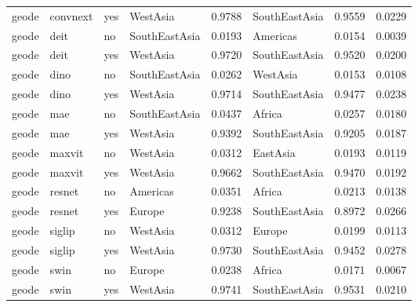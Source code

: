 \begin{table}[ht]
{\begin{tabular}{llllllll}
geode & convnext & yes & WestAsia & 0.9788 & SouthEastAsia & 0.9559 & 0.0229 \\
geode & deit & no & SouthEastAsia & 0.0193 & Americas & 0.0154 & 0.0039 \\
geode & deit & yes & WestAsia & 0.9720 & SouthEastAsia & 0.9520 & 0.0200 \\
geode & dino & no & SouthEastAsia & 0.0262 & WestAsia & 0.0153 & 0.0108 \\
geode & dino & yes & WestAsia & 0.9714 & SouthEastAsia & 0.9477 & 0.0238 \\
geode & mae & no & SouthEastAsia & 0.0437 & Africa & 0.0257 & 0.0180 \\
geode & mae & yes & WestAsia & 0.9392 & SouthEastAsia & 0.9205 & 0.0187 \\
geode & maxvit & no & WestAsia & 0.0312 & EastAsia & 0.0193 & 0.0119 \\
geode & maxvit & yes & WestAsia & 0.9662 & SouthEastAsia & 0.9470 & 0.0192 \\
geode & resnet & no & Americas & 0.0351 & Africa & 0.0213 & 0.0138 \\
geode & resnet & yes & Europe & 0.9238 & SouthEastAsia & 0.8972 & 0.0266 \\
geode & siglip & no & WestAsia & 0.0312 & Europe & 0.0199 & 0.0113 \\
geode & siglip & yes & WestAsia & 0.9730 & SouthEastAsia & 0.9452 & 0.0278 \\
geode & swin & no & Europe & 0.0238 & Africa & 0.0171 & 0.0067 \\
geode & swin & yes & WestAsia & 0.9741 & SouthEastAsia & 0.9531 & 0.0210 \\
\bottomrule
\end{tabular}
}%
\end{table}
